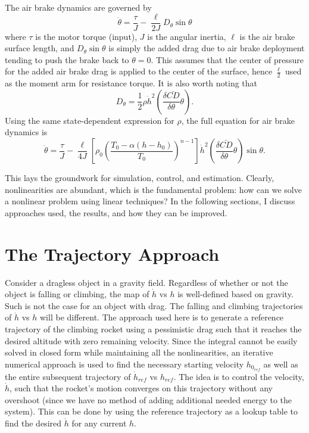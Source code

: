 \documentclass{article}
\begin{document}
  The air brake dynamics are governed by
  \begin{equation}
    \ddot{\theta} = \frac{\tau}{J} - \frac{\ell}{2J}D_\theta \sin \theta
  \end{equation}
  where $\tau$ is the motor torque (input), $J$ is the angular inertia, $\ell$ is the air brake surface length, and $D_\theta \sin \theta$ is simply the added drag due to air brake deployment tending to push the brake back to $\theta=0$. This assumes that the center of pressure for the added air brake drag is applied to the center of the surface, hence $\frac{\ell}{2}$ used as the moment arm for resistance torque. It is also worth noting that
  \begin{equation}
    D_\theta = \frac{1}{2} \rho \dot{h}^2 \left(\frac{\delta\bar{CD}}{\delta\theta} \theta \right).
  \end{equation}
  Using the same state-dependent expression for $\rho$, the full equation for air brake dynamics is
  \begin{equation}
    \ddot{\theta} = \frac{\tau}{J} - \frac{\ell}{4J} \left[ \rho_0 \left(   \frac{T_0 - \alpha\left( h-h_0 \right)}{T_0}   \right)^{n-1} \right] \dot{h}^2 \left(\frac{\delta\bar{CD}}{\delta\theta} \theta \right) \sin \theta .
  \end{equation}

  This lays the groundwork for simulation, control, and estimation. Clearly, nonlinearities are abundant, which is the fundamental problem: how can we solve a nonlinear problem using linear techniques? In the following sections, I discuss approaches used, the results, and how they can be improved.

\section{The Trajectory Approach}
  Consider a dragless object in a gravity field. Regardless of whether or not the object is falling or climbing, the map of $\dot{h}$ vs $h$ is well-defined based on gravity. Such is not the case for an object with drag. The falling and climbing trajectories of $\dot{h}$ vs $h$ will be different. The approach used here is to generate a reference trajectory of the climbing rocket using a pessimistic drag such that it reaches the desired altitude with zero remaining velocity. Since the integral cannot be easily solved in closed form while maintaining all the nonlinearities, an iterative numerical approach is used to find the necessary starting velocity $h_{0_{ref}}$ as well as the entire subsequent trajectory of $\dot{h}_{ref}$ vs $h_{ref}$. The idea is to control the velocity, $\dot{h}$, such that the rocket's motion converges on this trajectory without any overshoot (since we have no method of adding additional needed energy to the system). This can be done by using the reference trajectory as a lookup table to find the desired $\dot{h}$ for any current $h$.
\end{document}
